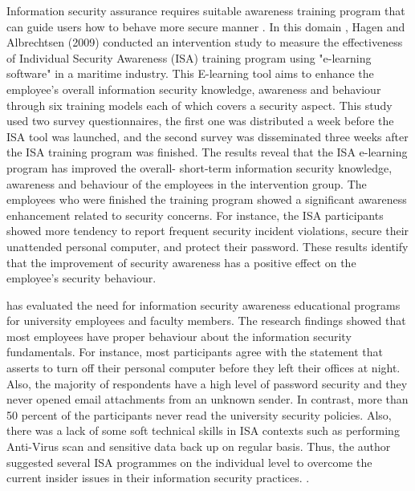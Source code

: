 Information security assurance requires suitable awareness training program that can guide users how to behave more secure manner \cite{safa2015information}. In this domain , Hagen and Albrechtsen (2009) conducted an intervention study to measure the effectiveness of Individual Security  Awareness (ISA) training program using "e-learning software" in a maritime industry. This E-learning tool aims to enhance the employee's overall information security knowledge, awareness and behaviour through six training models each of which covers a security aspect. This study used two survey questionnaires, the first one was distributed a week before the ISA tool was launched, and the second survey was disseminated three weeks after the ISA training program was finished. The results reveal that the ISA e-learning program has improved the overall- short-term information security knowledge, awareness and behaviour of the employees in the intervention group. The employees who were finished the training program showed a significant awareness enhancement related to security concerns. For instance, the ISA participants showed more tendency to report frequent security incident violations, secure their unattended personal computer, and protect their password. These results identify that the improvement of security awareness has a positive effect on the employee's security behaviour.

\citet{Katz2005} has evaluated the need for information security awareness educational programs for university employees and faculty members. The research findings showed that most employees have proper behaviour about the information security fundamentals. For instance, most participants agree with the statement that asserts to turn off their personal computer before they left their offices at night. Also, the majority of respondents have a high level of password security and they never opened email attachments from an unknown sender. In contrast, more than 50 percent of the participants never read the university security policies. Also, there was a lack of some soft technical skills in ISA contexts such as performing Anti-Virus scan and sensitive data back up on regular basis. Thus, the author suggested several ISA programmes on the individual level to overcome the current insider issues in their information security practices. .
